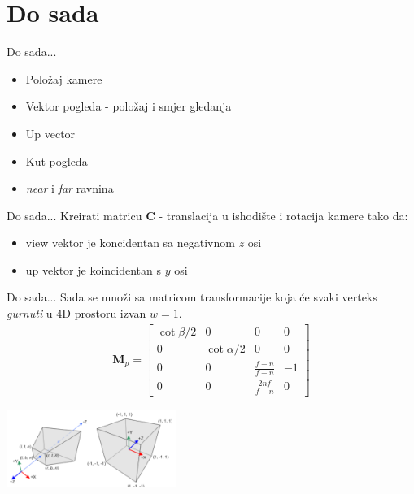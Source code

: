 \documentclass[9pt]{beamer}
\begin{document}
\section{Do sada}
\begin{frame}{Do sada...}
	
	\begin{itemize}
		\item Položaj kamere
		\item Vektor pogleda - položaj i smjer gledanja
		\item Up vector
		\item Kut pogleda
		\item \textit{near} i \textit{far} ravnina
	\end{itemize}
\end{frame}

\begin{frame}{Do sada...}
	Kreirati matricu \textbf{C} - translacija u ishodište i rotacija kamere  tako da:
	\begin{itemize}
		\item view vektor je koncidentan sa negativnom $z$ osi
		\item up vektor je koincidentan s $y$ osi
	\end{itemize}
\end{frame}

\begin{frame}{Do sada...}
	Sada se množi sa matricom transformacije koja će svaki verteks \textit{gurnuti} u 4D prostoru izvan $w=1$.
	\begin{align*}
	\mathbf{M}_p =  \left[ \begin{array}{cccc}
	\cot \beta/2 & 0 & 0 & 0 \\
	0 & \cot \alpha/2 & 0 & 0 \\
	0 & 0 & \frac{f+n}{f-n} & -1 \\
	0 & 0 & \frac{2nf}{f-n} & 0 
	\end{array} \right]
	\end{align*}
	\begin{center}
		\includegraphics[height=2.5cm]{slike/perspective_projection.png}
	\end{center}
\end{frame}
\end{document}

